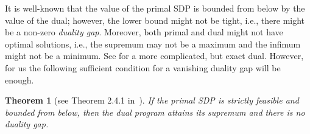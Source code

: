 \documentclass[11pt]{article}
\newtheorem{theorem}{Theorem}[section]
\theoremstyle{definition}
\theoremstyle{remark}
\begin{document}
It is well-known that the value of the primal SDP is bounded from below by the value of the dual; however, the lower bound might not be tight, i.e., there might be a non-zero \emph{duality gap}. Moreover, 
both primal and dual might not have optimal solutions, i.e., the supremum may not be a maximum and the infimum might not be a minimum. See \cite{Ramana} for a more complicated, but exact dual. However, for us the following sufficient condition for a vanishing duality gap will be enough. 

\begin{theorem}[see Theorem 2.4.1 in~\cite{ben-tal_nemirovski}]\label{thm:strong-dual}
    If the primal SDP is strictly feasible and bounded from below, then the dual program attains its supremum and there is no duality gap.
\end{theorem}
\end{document}
